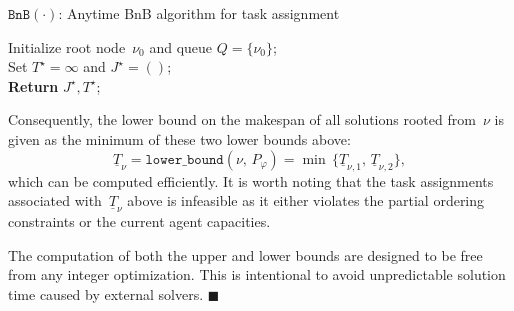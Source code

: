 \begin{algorithm}[t]
\caption{$\texttt{BnB}(\cdot)$: Anytime BnB algorithm for task assignment}
\label{alg:BnB}
Initialize root node~$\nu_0$ and queue $Q=\{\nu_0\}$; \label{algline:init-start}\\
Set $T^\star=\infty$ and $J^\star=()$;\label{algline:init-end}\\
\textbf{Return} $J^\star, T^\star$;
\end{algorithm}

Consequently, the lower bound on the makespan of all solutions rooted from~$\nu$
is given as the minimum of these two lower bounds above:
\begin{equation}\label{eq:lower-bound}
\underline{T}_\nu = \texttt{lower\_bound}(\nu,\,P_{\varphi})
= \min\,\{\underline{T}_{\nu,1},\, \underline{T}_{\nu,2}\},
\end{equation}
which can be computed efficiently.
It is worth noting that the task assignments associated with~$\underline{T}_\nu$
above is infeasible as it either violates the partial ordering constraints or
the current agent capacities.



\begin{remark}\label{remark:none-milp}
The computation of both the upper and lower bounds are designed
to be free from any integer optimization.
This is intentional to avoid unpredictable solution time caused by
external solvers.
\hfill $\blacksquare$
\end{remark}

